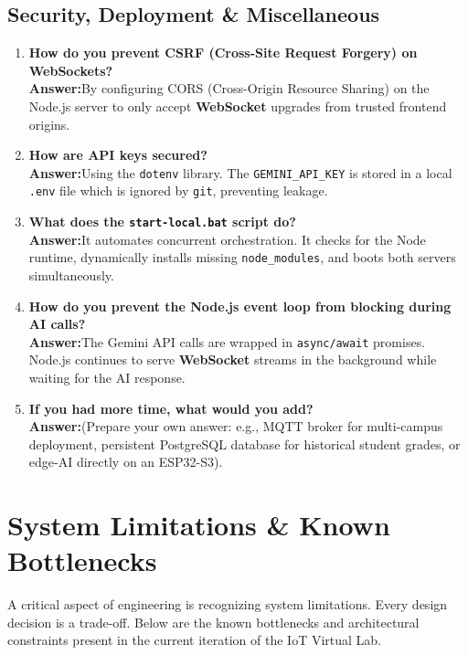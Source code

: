 \documentclass[12pt,a4paper]{article}
\newcommand{\keyword}[1]{\textcolor{keywordcolor}{\textbf{#1}}}
\newcommand{\Q}[1]{\textcolor{questioncolor}{\textbf{#1}}}
\newcommand{\A}{\textcolor{answercolor}{\textbf{Answer:}}}
\newcommand{\codeinline}[1]{\texttt{\small #1}}
\begin{document}
\subsection*{Security, Deployment \& Miscellaneous}
\begin{enumerate}[resume]
    \item \Q{How do you prevent CSRF (Cross-Site Request Forgery) on \keyword{WebSocket}s?} \\ \A By configuring CORS (Cross-Origin Resource Sharing) on the Node.js server to only accept \keyword{WebSocket} upgrades from trusted frontend origins.
    \item \Q{How are API keys secured?} \\ \A Using the \texttt{dotenv} library. The \texttt{GEMINI\_API\_KEY} is stored in a local \texttt{.env} file which is ignored by \texttt{git}, preventing leakage.
    \item \Q{What does the \codeinline{start-local.bat} script do?} \\ \A It automates concurrent orchestration. It checks for the Node runtime, dynamically installs missing \codeinline{node\_modules}, and boots both servers simultaneously.
    \item \Q{How do you prevent the Node.js event loop from blocking during AI calls?} \\ \A The Gemini API calls are wrapped in \texttt{async/await} promises. Node.js continues to serve \keyword{WebSocket} streams in the background while waiting for the AI response.
    \item \Q{If you had more time, what would you add?} \\ \A (Prepare your own answer: e.g., MQTT broker for multi-campus deployment, persistent PostgreSQL database for historical student grades, or edge-AI directly on an ESP32-S3).
\end{enumerate}

\vspace{0.5cm}

\section*{System Limitations \& Known Bottlenecks}

\begin{tcolorbox}[warningbox, title=\faExclamationTriangle\; Engineering Trade-Offs]
A critical aspect of engineering is recognizing system limitations. Every design decision is a trade-off. Below are the known bottlenecks and architectural constraints present in the current iteration of the IoT Virtual Lab.
\end{tcolorbox}
\vspace{0.3cm}
\end{document}
